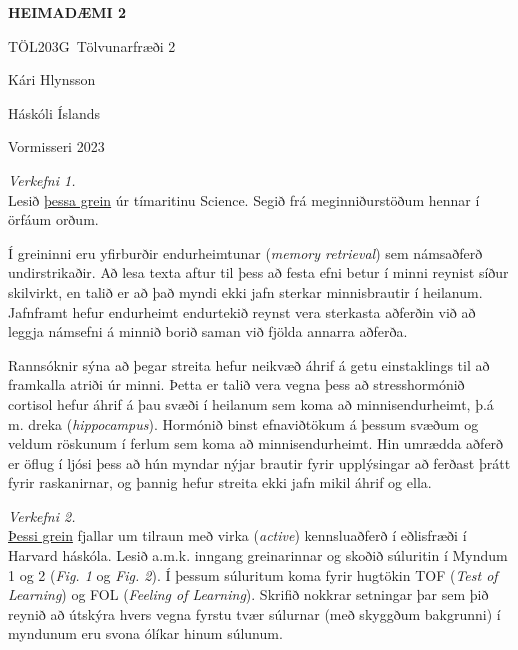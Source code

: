 \documentclass[a4paper, 12pt]{article}
\newcommand{\doctitle}{\uppercase{HEIMADÆMI 2}}
\newcommand{\coursename}{Tölvunarfræði 2}
\newcommand{\coursenum}{TÖL203G}
\begin{document}
\vspace*{.5cm}
\centerline{\bfseries\Large\doctitle}
\medskip
\centerline{\large\coursenum\ \coursename}
\bigskip
\bigskip
\centerline{\large Kári Hlynsson}
\bigskip
\centerline{Háskóli Íslands}
\medskip
\centerline{Vormisseri 2023}
\bigskip
\bigskip

\large

\noindent
\emph{Verkefni 1.} \\ 
Lesið \href{https://pubmed.ncbi.nlm.nih.gov/27885031/}{þessa grein} úr tímaritinu Science.  Segið frá meginniðurstöðum 
hennar í örfáum orðum.

\begin{description}[leftmargin=!,labelwidth=\widthof{\bfseries Example:},labelindent=0em]
  \item[Úrlausn]
  Í greininni eru yfirburðir endurheimtunar (\emph{memory retrieval}) sem námsaðferð undirstrikaðir. 
  Að lesa texta aftur til þess að festa efni betur í minni reynist síður skilvirkt, en talið er að það myndi ekki jafn sterkar minnisbrautir í heilanum. 
  Jafnframt hefur endurheimt endurtekið reynst vera sterkasta aðferðin við að leggja námsefni á minnið borið saman við fjölda annarra aðferða.

  \medskip
  Rannsóknir sýna að þegar streita hefur neikvæð áhrif á getu einstaklings til að framkalla atriði úr minni. 
  Þetta er talið vera vegna þess að stresshormónið cortisol hefur áhrif á þau svæði í heilanum sem koma að minnisendurheimt, þ.á m. dreka (\emph{hippocampus}). 
  Hormónið binst efnaviðtökum á þessum svæðum og veldum röskunum í ferlum sem koma að minnisendurheimt. Hin umrædda aðferð er öflug í ljósi þess að hún myndar nýjar brautir fyrir upplýsingar að ferðast þrátt fyrir raskanirnar, og þannig hefur streita ekki jafn mikil áhrif og ella.
\end{description}

\newpage
\noindent
\emph{Verkefni 2.} \\ 
\href{https://www.pnas.org/doi/10.1073/pnas.1821936116}{Þessi grein} fjallar um tilraun með virka (\emph{active}) kennsluaðferð í eðlisfræði 
í Harvard háskóla.  Lesið a.m.k. inngang greinarinnar og skoðið súluritin í Myndum 1 og 2 
(\emph{Fig. 1} og \emph{Fig. 2}).  Í þessum súluritum koma fyrir hugtökin TOF (\emph{Test of Learning}) og FOL 
(\emph{Feeling of Learning}).  Skrifið nokkrar setningar þar sem þið reynið að útskýra hvers 
vegna fyrstu tvær súlurnar (með skyggðum bakgrunni) í myndunum eru svona ólíkar 
hinum súlunum.
\end{document}
